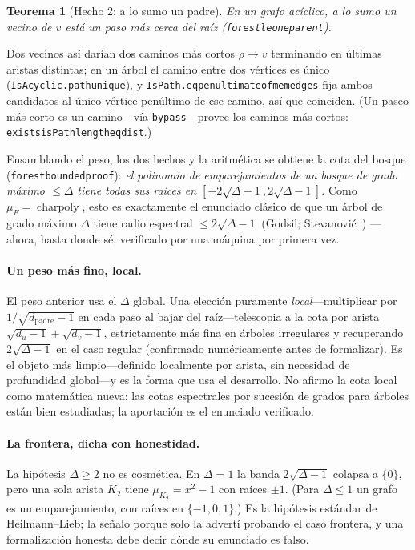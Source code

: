 \documentclass[11pt]{article}
\newtheorem{theorem}{Teorema}
\newcommand{\lean}[1]{{\def\_{\textunderscore\allowbreak}\texttt{#1}}}
\begin{document}
\begin{theorem}[Hecho 2: a lo sumo un padre]
\label{thm:f2}
En un grafo ac\'iclico, a lo sumo un vecino de $v$ est\'a un paso m\'as cerca del
raíz (\lean{forest\_le\_one\_parent}).
\end{theorem}

Dos vecinos as\'i dar\'ian dos caminos m\'as cortos $\rho\to v$ terminando en
\'ultimas aristas distintas; en un \'arbol el camino entre dos v\'ertices es \'unico
(\lean{IsAcyclic.path\_unique}), y \lean{IsPath.eq\_penultimate\_of\_mem\_edges}
fija ambos candidatos al \'unico v\'ertice pen\'ultimo de ese camino, as\'i que
coinciden. (Un paseo m\'as corto es un camino---v\'ia \lean{bypass}---provee los
caminos m\'as cortos: \lean{exists\_isPath\_length\_eq\_dist}.)

Ensamblando el peso, los dos hechos y la aritm\'etica se obtiene la cota del bosque
(\lean{forest\_bounded\_proof}): \emph{el polinomio de emparejamientos de un bosque
de grado m\'aximo $\le\Delta$ tiene todas sus ra\'ices en
$[-2\sqrt{\Delta-1},2\sqrt{\Delta-1}]$.} Como $\mu_F=\operatorname{charpoly}$, esto
es exactamente el enunciado cl\'asico de que un \'arbol de grado m\'aximo $\Delta$
tiene radio espectral $\le2\sqrt{\Delta-1}$ (Godsil; Stevanovi\'c~\cite{Stevanovic2003})
---ahora, hasta donde s\'e, verificado por una m\'aquina por primera vez.

\paragraph{Un peso m\'as fino, local.} El peso anterior usa el $\Delta$ global. Una
elecci\'on puramente \emph{local}---multiplicar por $1/\sqrt{d_{\text{padre}}-1}$ en
cada paso al bajar del raíz---telescopia a la cota por arista
$\sqrt{d_u-1}+\sqrt{d_v-1}$, estrictamente m\'as fina en \'arboles irregulares y
recuperando $2\sqrt{\Delta-1}$ en el caso regular (confirmado num\'ericamente antes
de formalizar). Es el objeto m\'as limpio---definido localmente por arista, sin
necesidad de profundidad global---y es la forma que usa el desarrollo. No afirmo la
cota local como matem\'atica nueva: las cotas espectrales por sucesi\'on de grados
para \'arboles est\'an bien estudiadas; la aportaci\'on es el enunciado verificado.

\paragraph{La frontera, dicha con honestidad.} La hip\'otesis $\Delta\ge2$ no es
cosm\'etica. En $\Delta=1$ la banda $2\sqrt{\Delta-1}$ colapsa a $\{0\}$, pero una
sola arista $K_2$ tiene $\mu_{K_2}=x^2-1$ con ra\'ices $\pm1$. (Para $\Delta\le1$ un
grafo es un emparejamiento, con ra\'ices en $\{-1,0,1\}$.) Es la hip\'otesis
est\'andar de Heilmann--Lieb; la se\~nalo porque solo la advert\'i probando el caso
frontera, y una formalizaci\'on honesta debe decir d\'onde su enunciado es falso.
\end{document}
